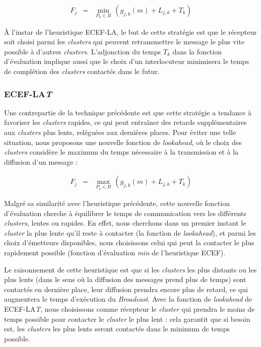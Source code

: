 \begin{eqnarray*}
	F_{j} & = & \min_{P_{k}\in B}\,(g_{j,k}(m)+L_{j,k}+T_{k})\end{eqnarray*}


À l'instar de l'heuristique ECEF-LA, le but de cette stratégie est
que le récepteur soit choisi parmi les  \textit{clusters} qui peuvent retransmettre
le message le plus vite possible à d'autres  \textit{clusters}. L'adjonction
du temps $T_{k}$ dans la fonction d'évaluation implique aussi que
le choix d'un interlocuteur minimisera le temps de complétion des
 \textit{clusters} contactés dans le futur. 


\subsubsection*{ECEF-LA\emph{T}}

Une contrepartie de la technique précédente est que cette stratégie
a tendance à favoriser les  \textit{clusters} rapides, ce qui peut entraîner
des retards supplémentaires aux  \textit{clusters} plus lents, reléguées aux
dernières places. Pour éviter une telle situation, nous proposons
une nouvelle fonction de \emph{lookahead}, où le choix des  \textit{clusters}
considère le maximum du temps nécessaire à la transmission et à la
diffusion d'un message : 

\begin{eqnarray*}
	F_{j} & = & \max_{P_{k}\in B}\,(g_{j,k}(m)+L_{j,k}+T_{k})\end{eqnarray*}


Malgré sa similarité avec l'heuristique précédente, cette nouvelle
fonction d'évaluation cherche à équilibrer le temps de communication
vers les différents  \textit{clusters}, lentes ou rapides. En effet, nous cherchons
dans un premier instant le  \textit{cluster} la plus lente qu'il reste à contacter
(la fonction de \emph{lookahead}), et parmi les choix d'émetteurs
disponibles, nous choisissons celui qui peut la contacter le plus
rapidement possible (fonction d'évaluation \emph{min} de l'heuristique
ECEF).

Le raisonnement de cette heuristique est que si les  \textit{clusters} les plus
distants ou les plus lents (dans le sens où la diffusion des messages
prend plus de temps) sont contactés en dernière place, leur diffusion
prendra encore plus de retard, ce qui augmentera le temps d'exécution
du \textit{Broadcast}. Avec la fonction de \emph{lookahead} de ECEF-LA\emph{T},
nous choisissons comme récepteur le  \textit{cluster} qui prendra le moins de
temps possible pour contacter le  \textit{cluster} le plus lent : cela garantit
que si besoin est, les  \textit{clusters} les plus lents seront contactés dans
le minimum de temps possible.



